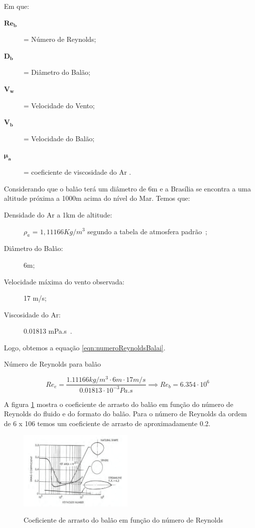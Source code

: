 	Em que:
	\begin{description}
		\item[$\boldsymbol{Re_{b}}$] = Número de Reynolds;
		\item[$\boldsymbol{D_{b}}$] = Diâmetro do Balão;
		\item[$\boldsymbol{V_{w}}$] = Velocidade do Vento;
		\item[$\boldsymbol{V_{b}}$] = Velocidade do Balão;
		\item[$\boldsymbol{\mu_{a}}$] = coeficiente de viscosidade do Ar .
	\end{description}

	Considerando que o balão terá um diâmetro de 6m e a Brasília se encontra a uma altitude próxima a 1000m acima do nível do Mar. Temos que:

	\begin{description}
		\item[Densidade do Ar a 1km de altitude:] $\rho_{a}$ = $1,11166 Kg/m^3$ segundo a tabela de atmosfera padrão~\cite{bird};
		\item[Diâmetro do Balão:] 6m;
		\item[Velocidade máxima do vento observada:] 17 m/s;
		\item[Viscosidade do Ar:] 0.01813 mPa.s~\cite{bird}.
	\end{description}

	Logo, obtemos a equação \eqref{eqn:numeroReynoldsBalai}.

	\begin{equacao}
	\caption{Número de Reynolds para balão}
		\begin{equation}
			Re_{e} = \frac{1.11166 kg/m^3 \cdot 6m \cdot 17 m/s}{0.01813 \cdot 10^{-3} Pa.s} \implies Re_{b} = 6.354 \cdot 10^6
		\end{equation}
		\label{eqn:numeroReynoldsBalai}
	\end{equacao}

	A figura \ref{img:coeficienteArrasto} mostra o coeficiente de arrasto do balão em função do número de Reynolds do fluido e do formato do balão. Para o número de Reynolds da ordem de 6 x 106  temos um coeficiente de arrasto de aproximadamente 0.2.

	\begin{figure}[htp]
		\centering
		\caption[Coeficiente de arrasto do balão em função do número de Reynolds do fluido e do formato do balão]{Coeficiente de arrasto do balão em função do número de Reynolds~\cite{myers}}
		\includegraphics[width=0.5\textwidth]{figuras/coeficienteArrasto}
		\label{img:coeficienteArrasto}
	\end{figure}

